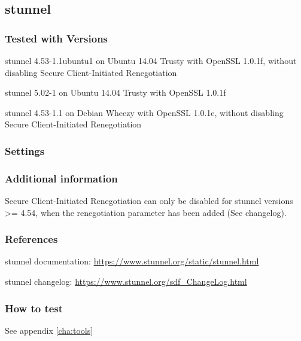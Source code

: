 \subsection{stunnel}

\subsubsection{Tested with Versions}
\begin{itemize*}
  \item stunnel 4.53-1.1ubuntu1 on Ubuntu 14.04 Trusty with OpenSSL 1.0.1f, without disabling Secure Client-Initiated Renegotiation
  \item stunnel 5.02-1 on Ubuntu 14.04 Trusty with OpenSSL 1.0.1f
  \item stunnel 4.53-1.1 on Debian Wheezy with OpenSSL 1.0.1e, without disabling Secure Client-Initiated Renegotiation
\end{itemize*}

\subsubsection{Settings}

\subsubsection{Additional information}
Secure Client-Initiated Renegotiation can only be disabled for stunnel versions >= 4.54, when the renegotiation parameter has been added (See changelog).

\subsubsection{References} 
\begin{itemize*}
  \item stunnel documentation: \url{https://www.stunnel.org/static/stunnel.html}
  \item stunnel changelog: \url{https://www.stunnel.org/sdf_ChangeLog.html}
\end{itemize*}


\subsubsection{How to test} 
See appendix \ref{cha:tools}

